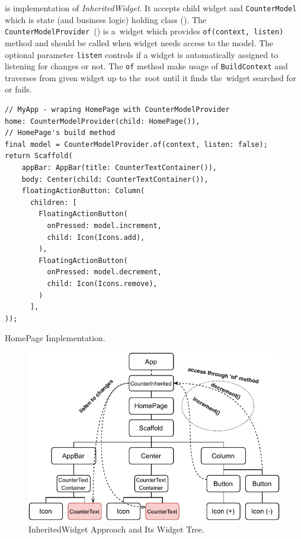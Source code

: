  is implementation of \textit{InheritedWidget}. It accepts child widget and \verb|CounterModel| which is state (and business logic) holding class (). The \verb|CounterModelProvider|~() is a~widget which provides \verb|of(context, listen)| method and should be called when widget needs access to the model. The optional parameter \verb|listen| controls if a widget is automatically assigned to listening for changes or not. The \verb|of| method make usage of \verb|BuildContext| and traverses from given widget up to the~root until it finds the~widget searched for or fails. 

\begin{listing}[ht]
\begin{verbatim}
// MyApp - wraping HomePage with CounterModelProvider
home: CounterModelProvider(child: HomePage()),
// HomePage's build method
final model = CounterModelProvider.of(context, listen: false);
return Scaffold(
    appBar: AppBar(title: CounterTextContainer()),
    body: Center(child: CounterTextContainer()),
    floatingActionButton: Column(
      children: [
        FloatingActionButton(
          onPressed: model.increment,
          child: Icon(Icons.add),
        ),
        FloatingActionButton(
          onPressed: model.decrement,
          child: Icon(Icons.remove),
        )
      ],
));
\end{verbatim}
\caption{HomePage Implementation.}
\label{listing:counter-inherited-homepage}
\end{listing}

\begin{figure}[!htb]
    \centering
    \includegraphics[width=0.75\linewidth]{img/flutter/counter-inherited-widget.pdf}
    \caption{InheritedWidget Approach and Its Widget Tree.}
    \label{fig:counter-app-inherited-widget}
\end{figure}

